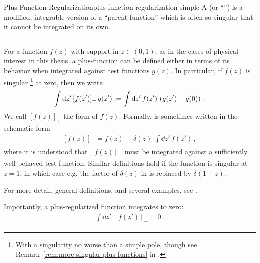 \begin{definitionbox}{Plus-Function Regularization}{plus-function-regularization-simple}
    A  (or ``'') is a modified, integrable version of a ``parent function'' which is often so singular that it cannot be integrated on its own.

    \vspace{7pt}
    \hrule
    \vspace{7pt}

    For a function \(f(z)\) with support in \(z \in (0,1)\), as in the cases of physical interest in this thesis, a plus-function can be defined either in terms of its behavior when integrated against test functions \(g(z)\).
    In particular, if \(f(z)\) is singular%
    \footnote{With a singularity no worse than a simple pole, though see Remark~\ref{rem:more-singular-plus-functions} in .}
    at zero, then we write
    \begin{align}
        \label{eq:plus-fn-simple-main}
        \int \dd z'
        \,
        [f(z')]_+
        \,
        g(z')
        :=
        \int \dd z'
        \,
        f(z')
        \,
        \le(g(z') - g(0)\ri)
        \,.
    \end{align}
    We call \([f(z)]_+\) the  form of \(f(z)\).
    Formally,  is sometimes written in the schematic form
    \begin{align}
        \label{eq:plus-fn-simple-delta}
        [f(z)]_+
        =
        f(z)
        -
        \,
        \delta(z)
        \,\,
        \int \dd z'
        \,
        f(z')
        \,,
    \end{align}
    where it is understood that \([f(z)]_+\) must be integrated against a sufficiently well-behaved test function.
    Similar definitions hold if the function is singular at \(z=1\), in which case e.g. the factor of \(\delta(z)\) in  is replaced by \(\delta(1-z)\).

    For more detail, general definitions, and several examples, see .
\end{definitionbox}

Importantly, a plus-regularized function integrates to zero:
\begin{align}
    \int\dd z'
    \,\,
    [f(z')]_+
    =
    0
    \,.
\end{align}

